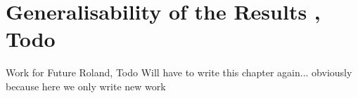 \section{Generalisability of the Results , Todo}
Work for Future Roland, Todo
Will have to write this chapter again... obviously because here we only write new work

